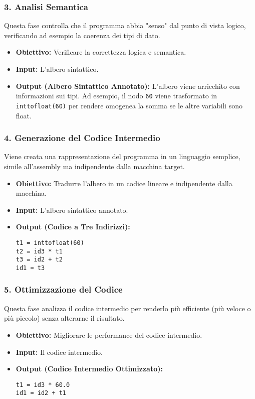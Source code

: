 \documentclass[a4paper, 11pt]{article}
\begin{document}
\subsubsection{3. Analisi Semantica}
Questa fase controlla che il programma abbia "senso" dal punto di vista logico, verificando ad esempio la coerenza dei tipi di dato.
\begin{itemize}
    \item \textbf{Obiettivo:} Verificare la correttezza logica e semantica.
    \item \textbf{Input:} L'albero sintattico.
    \item \textbf{Output (Albero Sintattico Annotato):} L'albero viene arricchito con informazioni sui tipi. Ad esempio, il nodo \texttt{60} viene trasformato in \texttt{inttofloat(60)} per rendere omogenea la somma se le altre variabili sono float.
\end{itemize}

\subsubsection{4. Generazione del Codice Intermedio}
Viene creata una rappresentazione del programma in un linguaggio semplice, simile all'assembly ma indipendente dalla macchina target.
\begin{itemize}
    \item \textbf{Obiettivo:} Tradurre l'albero in un codice lineare e indipendente dalla macchina.
    \item \textbf{Input:} L'albero sintattico annotato.
    \item \textbf{Output (Codice a Tre Indirizzi):}
    \begin{Verbatim}[frame=single, label=Codice Intermedio]
t1 = inttofloat(60)
t2 = id3 * t1
t3 = id2 + t2
id1 = t3
    \end{Verbatim}
\end{itemize}

\subsubsection{5. Ottimizzazione del Codice}
Questa fase analizza il codice intermedio per renderlo più efficiente (più veloce o più piccolo) senza alterarne il risultato.
\begin{itemize}
    \item \textbf{Obiettivo:} Migliorare le performance del codice intermedio.
    \item \textbf{Input:} Il codice intermedio.
    \item \textbf{Output (Codice Intermedio Ottimizzato):}
    \begin{Verbatim}[frame=single, label=Codice Ottimizzato]
t1 = id3 * 60.0
id1 = id2 + t1
    \end{Verbatim}
\end{itemize}
\end{document}
